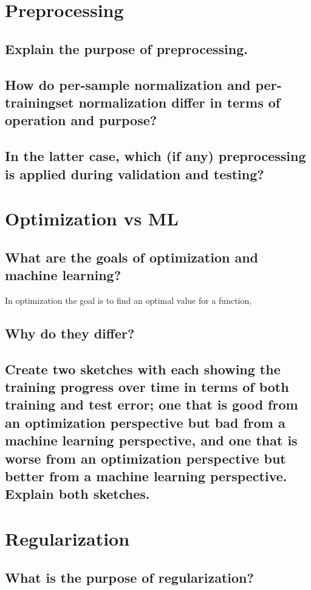 \section{Preprocessing}
\subsection{Explain the purpose of preprocessing.}
\subsection{How do per-sample normalization and per-trainingset normalization differ in terms of operation and purpose?}
\subsection{In the latter case, which (if any) preprocessing is applied during validation and testing?}

\section{Optimization vs ML}
\subsection{What are the goals of optimization and machine learning?}
In optimization the goal is to find an optimal value for a function, 
\subsection{Why do they differ?}
\subsection{Create two sketches with each showing the training progress over time in terms of both training and test error; one that is good from an optimization perspective but bad from a machine learning perspective, and one that is worse from an optimization perspective but better from a machine learning perspective. Explain both sketches.}

\section{Regularization}
\subsection{What is the purpose of regularization?}
